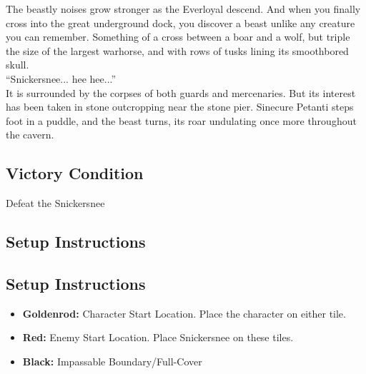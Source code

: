 The beastly noises grow stronger as the Everloyal descend. And when you finally cross into the great underground dock, you discover a beast unlike any creature you can remember. Something of a cross between a boar and a wolf, but triple the size of the largest warhorse, and with rows of tusks lining its smoothbored skull.\\
“Snickersnee... hee hee...”\\
It is surrounded by the corpses of both guards and mercenaries. But its interest has been taken in stone outcropping near the stone pier. Sinecure Petanti steps foot in a puddle, and the beast turns, its roar undulating once more throughout the cavern.

\subsection*{Victory Condition}
Defeat the Snickersnee

\subsection*{Setup Instructions}
\begin{center}
\end{center}

\subsection*{Setup Instructions}
\begin{itemize}
\item \textbf{Goldenrod:} Character Start Location. Place the character on either tile.
\item \textbf{Red:} Enemy Start Location. Place Snickersnee on these tiles.
\item \textbf{Black:} Impassable Boundary/Full-Cover
\end{itemize}

